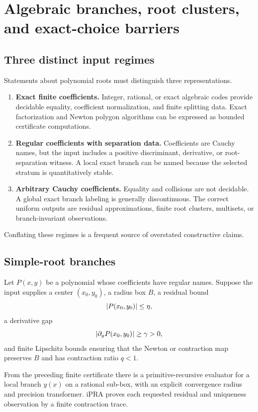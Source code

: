 \section{Algebraic branches, root clusters, and exact-choice barriers}
\label{sec:algebraic}

\subsection{Three distinct input regimes}

Statements about polynomial roots must distinguish three representations.

\begin{enumerate}[label=\arabic*.]
\item \textbf{Exact finite coefficients.}  Integer, rational, or exact algebraic codes provide decidable equality, coefficient normalization, and finite splitting data.  Exact factorization and Newton polygon algorithms can be expressed as bounded certificate computations.
\item \textbf{Regular coefficients with separation data.}  Coefficients are Cauchy names, but the input includes a positive discriminant, derivative, or root-separation witness.  A local exact branch can be named because the selected stratum is quantitatively stable.
\item \textbf{Arbitrary Cauchy coefficients.}  Equality and collisions are not decidable.  A global exact branch labeling is generally discontinuous.  The correct uniform outputs are residual approximations, finite root clusters, multisets, or branch-invariant observations.
\end{enumerate}

Conflating these regimes is a frequent source of overstated constructive claims.

\subsection{Simple-root branches}

Let $P(x,y)$ be a polynomial whose coefficients have regular names.  Suppose the input supplies a center $(x_0,y_0)$, a radius box $B$, a residual bound
\[
  \lvert P(x_0,y_0)\rvert\le\eta,
\]
a derivative gap
\[
  \lvert \partial_yP(x_0,y_0)\rvert\ge\gamma>0,
\]
and finite Lipschitz bounds ensuring that the Newton or contraction map preserves $B$ and has contraction ratio $q<1$.

\begin{theorem}
\label{thm:regular-branch}
From the preceding finite certificate there is a primitive-recursive evaluator for a local branch $y(x)$ on a rational sub-box, with an explicit convergence radius and precision transformer.  iPRA proves each requested residual and uniqueness observation by a finite contraction trace.
\end{theorem}

